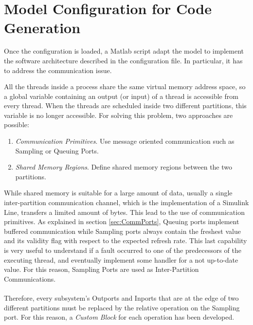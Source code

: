 \section{Model Configuration for Code Generation}
Once the configuration is loaded, a Matlab script adapt the model to implement the software architecture described in the configuration file. In particular, it has to address the communication issue.
\par All the threads inside a process share the same virtual memory address space, so a global variable containing an output (or input) of a thread is accessible from every thread. When the threads are scheduled inside two different partitions, this variable is no longer accessible. For solving this problem, two approaches are possible:
\begin{enumerate}
\item \emph{Communication Primitives}. Use message oriented communication such as Sampling or Queuing Ports.
\item \emph{Shared Memory Regions}. Define shared memory regions between the two partitions.
\end{enumerate}
While shared memory is suitable for a large amount of data, usually a single inter-partition communication channel, which is the implementation of a Simulink Line, transfers a limited amount of bytes. This lead to the use of communication primitives. As explained in section \ref{sec:CommPorts}, Queuing ports implement buffered communication while Sampling ports always contain the freshest value and its validity flag with respect to the expected refresh rate. This last capability is very useful to understand if a fault occurred to one of the predecessors of the executing thread, and eventually implement some handler for a not up-to-date value. For this reason, Sampling Ports are used as Inter-Partition Communications.

\paragraph{} Therefore, every subsystem's Outports and Inports that are at the edge of two different partitions must be replaced by the relative operation on the Sampling port. For this reason, a \emph{Custom Block} for each operation has been developed.

